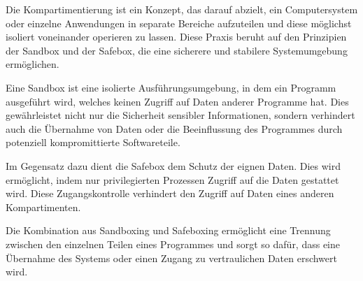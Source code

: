 Die Kompartimentierung ist ein Konzept, das darauf abzielt, ein Computersystem oder einzelne Anwendungen in separate Bereiche aufzuteilen und diese möglichst isoliert voneinander operieren zu lassen. Diese Praxis beruht auf den Prinzipien der Sandbox und der Safebox, die eine sicherere und stabilere Systemumgebung ermöglichen. 

Eine Sandbox ist eine isolierte Ausführungsumgebung, in dem ein Programm ausgeführt wird, welches keinen Zugriff auf Daten anderer Programme hat. Dies gewährleistet nicht nur die Sicherheit sensibler Informationen, sondern verhindert auch die Übernahme von Daten oder die Beeinflussung des Programmes durch potenziell kompromittierte Softwareteile.

Im Gegensatz dazu dient die Safebox dem Schutz der eignen Daten. Dies wird ermöglicht, indem nur privilegierten Prozessen Zugriff auf die Daten gestattet wird. Diese Zugangskontrolle verhindert den Zugriff auf Daten eines anderen Kompartimenten. 

Die Kombination aus Sandboxing und Safeboxing ermöglicht eine Trennung zwischen den einzelnen Teilen eines Programmes und sorgt so dafür, dass eine Übernahme des Systems oder einen Zugang zu vertraulichen Daten erschwert wird.